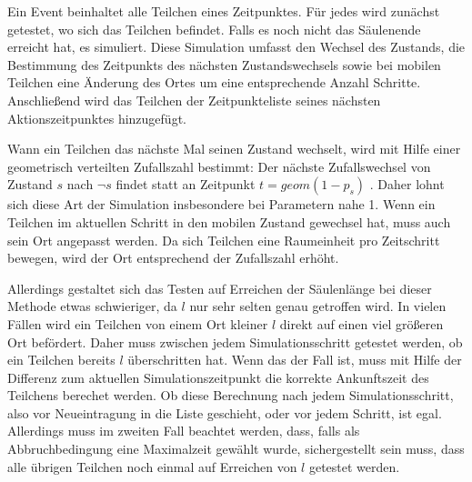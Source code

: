 
Ein Event beinhaltet alle Teilchen eines Zeitpunktes. Für jedes wird zunächst getestet, wo sich das Teilchen befindet. Falls es noch nicht das Säulenende erreicht hat, es simuliert. Diese Simulation umfasst den Wechsel des Zustands, die Bestimmung des Zeitpunkts des nächsten Zustandswechsels sowie bei mobilen Teilchen eine Änderung des Ortes um eine entsprechende Anzahl Schritte. Anschließend wird das Teilchen der Zeitpunkteliste seines nächsten Aktionszeitpunktes hinzugefügt.

Wann ein Teilchen das nächste Mal seinen Zustand wechselt, wird mit Hilfe einer geometrisch verteilten Zufallszahl bestimmt: Der nächste Zufallswechsel von Zustand $s$ nach $\neg s$ findet statt an Zeitpunkt $t= geom(1-p_s)$ . Daher lohnt sich diese Art der Simulation insbesondere bei Parametern nahe 1. 
Wenn ein Teilchen im aktuellen Schritt in den mobilen Zustand gewechsel hat, muss auch sein Ort angepasst werden. Da sich Teilchen eine Raumeinheit pro Zeitschritt bewegen, wird der Ort entsprechend der Zufallszahl erhöht.

Allerdings gestaltet sich das Testen auf Erreichen der Säulenlänge bei dieser Methode etwas schwieriger, da $l$ nur sehr selten genau getroffen wird. In vielen Fällen wird ein Teilchen von einem Ort kleiner $l$ direkt auf einen viel größeren Ort befördert. Daher muss zwischen jedem Simulationsschritt getestet werden, ob ein Teilchen bereits $l$ überschritten hat. Wenn das der Fall ist, muss mit Hilfe der Differenz zum aktuellen Simulationszeitpunkt die korrekte Ankunftszeit des Teilchens berechet werden.
Ob diese Berechnung nach jedem Simulationsschritt, also vor Neueintragung in die Liste geschieht, oder vor jedem Schritt, ist egal. Allerdings muss im zweiten Fall beachtet werden, dass, falls als Abbruchbedingung eine Maximalzeit gewählt wurde, sichergestellt sein muss, dass alle übrigen Teilchen noch einmal auf Erreichen von $l$ getestet werden.

